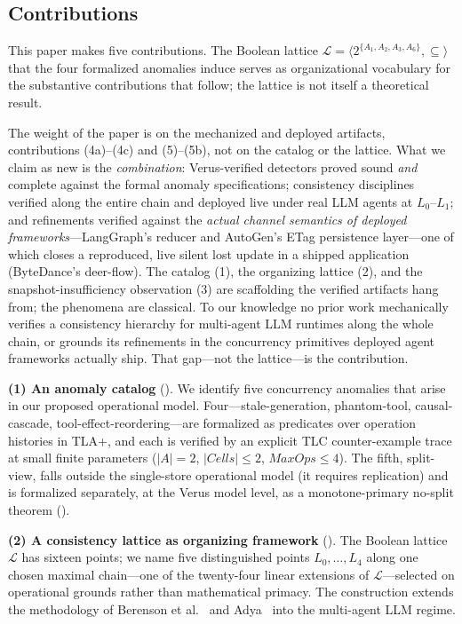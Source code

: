 \documentclass[journal,compsoc,10pt]{IEEEtran}
\theoremstyle{definition}
\theoremstyle{remark}
\newcommand{\fld}[1]{\mathit{#1}}
\begin{document}
\subsection{Contributions}
\label{sec:contributions}
This paper makes five contributions. The Boolean lattice
$\mathcal{L} = \langle 2^{\{A_1, A_2, A_3, A_6\}}, \subseteq
\rangle$ that the four formalized anomalies induce serves as
organizational vocabulary for the substantive contributions
that follow; the lattice is not itself a theoretical result.

\medskip
\noindent
The weight of the paper is on the mechanized and deployed artifacts,
contributions (4a)--(4c) and (5)--(5b), not on the catalog or the lattice.
What we claim as new is the \emph{combination}: Verus-verified detectors
proved sound \emph{and} complete against the formal anomaly specifications;
consistency disciplines verified along the entire chain and deployed live
under real LLM agents at $L_0$--$L_1$; and refinements verified against the
\emph{actual channel semantics of deployed frameworks}---LangGraph's
reducer and AutoGen's ETag persistence layer---one of which closes a
reproduced, live silent lost update in a shipped application (ByteDance's
deer-flow). The catalog (1), the organizing lattice (2), and the
snapshot-insufficiency observation (3) are scaffolding the verified
artifacts hang from; the phenomena are classical. To our knowledge no prior work
mechanically verifies a consistency hierarchy for multi-agent LLM runtimes
along the whole chain, or grounds its refinements in the concurrency
primitives deployed agent frameworks actually ship. That gap---not the
lattice---is the contribution.

\medskip
\noindent\textbf{(1) An anomaly catalog} ().
We identify five concurrency anomalies that arise in our proposed
operational model. Four---stale-generation, phantom-tool,
causal-cascade, tool-effect-reordering---are formalized as
predicates over operation histories in TLA+, and each is verified
by an explicit TLC counter-example trace at small finite parameters
($|A| = 2$, $|\fld{Cells}| \leq 2$, $\fld{MaxOps} \leq 4$). The
fifth, split-view, falls outside the single-store operational model
(it requires replication) and is formalized separately, at the Verus
model level, as a monotone-primary no-split theorem
().

\medskip
\noindent\textbf{(2) A consistency lattice as organizing
framework} (). The Boolean lattice $\mathcal{L}$
has sixteen points; we name five distinguished points
$L_0, \ldots, L_4$ along one chosen maximal chain---one of the
twenty-four linear extensions of $\mathcal{L}$---selected on
operational grounds rather than mathematical primacy. The construction
extends the methodology of Berenson et al.~\cite{BerensonEtAl1995} and
Adya~\cite{Adya1999} into the multi-agent LLM regime.
\end{document}
